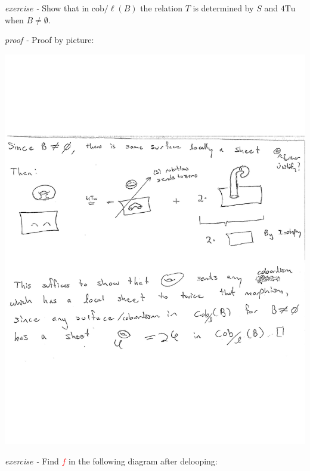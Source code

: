 \documentclass[11pt]{article}
\theoremstyle{definition}
\begin{document}
    \emph{exercise - } Show that in \(\text{cob}/\ell(B)\) the relation \(T\) is determined by \(S\) and \(4\text{Tu}\) when \(B \neq \emptyset\).

    \emph{proof - } Proof by picture:
    \begin{center}
        \includegraphics[width=\linewidth]{additional pdfs/4Tu and S relation imply.pdf}
    \end{center}
    \newpage


    \emph{exercise - } Find \textcolor{red}{\(f\)} in the following diagram after delooping:
\end{document}
